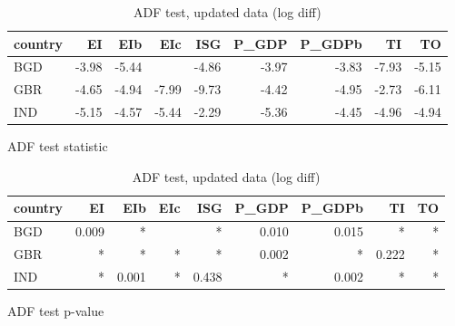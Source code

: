 \documentclass[11pt,a4paper]{article}
\begin{document}
\begin{table}[htbp]
\begin{subfigure}{\textwidth}
\centering
\begin{tabular}{lrrrrrrrr}
\toprule
country &    EI &   EIb &   EIc &   ISG &  P\_GDP &  P\_GDPb &    TI &    TO \\
\midrule
    BGD & -3.98 & -5.44 &       & -4.86 &  -3.97 &   -3.83 & -7.93 & -5.15 \\
    GBR & -4.65 & -4.94 & -7.99 & -9.73 &  -4.42 &   -4.95 & -2.73 & -6.11 \\
    IND & -5.15 & -4.57 & -5.44 & -2.29 &  -5.36 &   -4.45 & -4.96 & -4.94 \\
\bottomrule
\end{tabular}
\caption{ADF test statistic}
\end{subfigure}
\begin{subfigure}{\textwidth}
\centering
\begin{tabular}{lrrrrrrrr}
\toprule
country &    EI &   EIb &  EIc &   ISG &  P\_GDP &  P\_GDPb &    TI &  TO \\
\midrule
    BGD & 0.009 &     * &      &     * &  0.010 &   0.015 &     * &   * \\
    GBR &     * &     * &    * &     * &  0.002 &       * & 0.222 &   * \\
    IND &     * & 0.001 &    * & 0.438 &      * &   0.002 &     * &   * \\
\bottomrule
\end{tabular}
\caption[ADF test p-value]{ADF test p-value\footnotemark[\value{footnote}]}
\end{subfigure}
\caption{ADF test, updated data (log diff)}
\label{tab:adf_logdiff}
\end{table}


\end{document}
